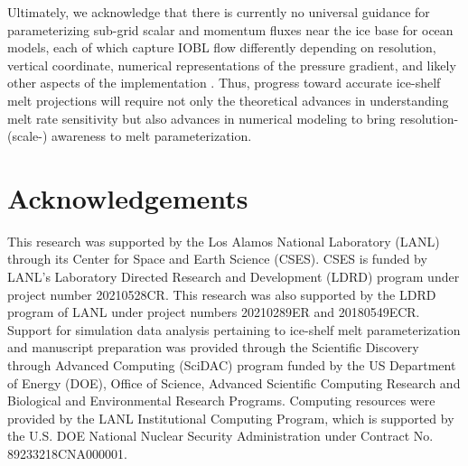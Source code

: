 \documentclass[draft]{styles/agujournal2019}
\begin{document}
Ultimately, we acknowledge that there is currently no universal guidance for parameterizing sub-grid scalar and momentum fluxes near the ice base for ocean models, each of which capture IOBL flow differently depending on resolution, vertical coordinate, numerical representations of the pressure gradient, and likely other aspects of the implementation \cite{gwyther_cold_2020}. Thus, progress toward accurate ice-shelf melt projections will require not only the theoretical advances in understanding melt rate sensitivity but also advances in numerical modeling to bring resolution- (scale-) awareness to melt parameterization.


\section{Acknowledgements}

This research was supported by the Los Alamos National
Laboratory (LANL) through its Center for Space and Earth Science
(CSES). CSES is funded by LANL’s Laboratory Directed Research
and Development (LDRD) program under project number
20210528CR. This research was also supported by the LDRD program of LANL under project numbers 20210289ER and 20180549ECR. Support for simulation data analysis pertaining to ice-shelf melt parameterization and manuscript preparation was provided through the Scientific Discovery through Advanced Computing (SciDAC) program funded by the US Department of Energy (DOE), Office of Science, Advanced Scientific Computing Research and Biological and Environmental Research Programs. Computing resources were provided by the LANL Institutional Computing Program, which is supported by the U.S. DOE National Nuclear Security Administration under Contract No. 89233218CNA000001. 

\newpage

\end{document}
